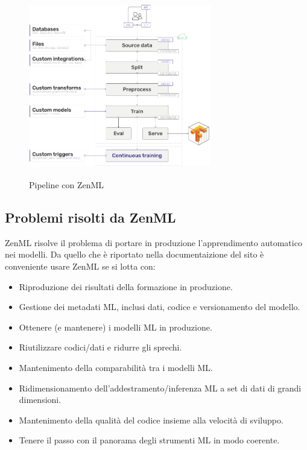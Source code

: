 \documentclass[12pt,a4paper]{report}
\begin{document}
\begin{figure}[h!]
    \begin{center}
        \includegraphics[width=8cm,height=8cm,keepaspectratio]{ZenML-schema}
    \end{center}
    \caption{Pipeline con ZenML}
    \label{fig:ZenML-schema}
\end{figure}

\subsection{Problemi risolti da ZenML}
ZenML risolve il problema di portare in produzione l'apprendimento automatico nei modelli. Da quello che è riportato nella documentaizione del sito è conveniente usare ZenML se si lotta con: \cite{ZenML}
\begin{itemize}
    \item Riproduzione dei risultati della formazione in produzione.
    \item Gestione dei metadati ML, inclusi dati, codice e versionamento del modello.
    \item Ottenere (e mantenere) i modelli ML in produzione.
    \item Riutilizzare codici/dati e ridurre gli sprechi.
    \item Mantenimento della comparabilità tra i modelli ML.
    \item Ridimensionamento dell'addestramento/inferenza ML a set di dati di grandi dimensioni.
    \item Mantenimento della qualità del codice insieme alla velocità di sviluppo.
    \item Tenere il passo con il panorama degli strumenti ML in modo coerente.
\end{itemize}
\end{document}

